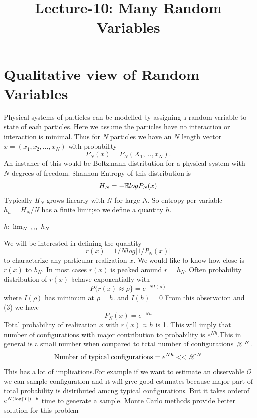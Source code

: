 \documentclass[letterpaper,english,10pt]{article}
\title{Lecture-10: Many Random Variables}
\begin{document}
\maketitle
\section{Qualitative view of Random Variables}
Physical systems of particles can be modelled by assigning a random variable to state of each particles. Here we assume the particles have no interaction or interaction is minimal. Thus for $N$ particles we have an $N$ length vector $x = (x_1,x_2,\dots ,x_N)$ with probability 
\begin{equation}
  P_N(x) = P_N(X_1,\dots ,x_N) .
\end{equation}
An instance of this would be Boltzmann distribution for a physical system with $N$ degrees of freedom. Shannon Entropy of this distribution is 
  \begin{equation}
      H_N = -\mathbb{E} {log P_N(x) }
  \end{equation}
  Typically $H_N$ grows linearly with $N$ for large $N$. So entropy per variable $h_n=H_N/N$ has a finite limit;so we define a quantity $h$.
  
 \begin{defn}
 	$h: \lim_{N\to\infty} h_N$
 \end{defn}
  We will be interested in defining the quantity 
  \begin{equation}
      r(x) = 1/N log \big[ 1/P_N(x)\big]
  \end{equation}
  to characterize any particular realization $\underbar{x}$. We would like to know how close is $r(x)$ to $h_N$. In most cases $r(x)$ is peaked around $r=h_N$. Often probability distribution of $r(x)$ behave exponentially with 
  \begin{equation}
   P\lbrace r(x) \approx \rho \rbrace=e^{-NI(\rho)}
   \end{equation}
   where
   $I(\rho)$ has minimum at $\rho = h$.
   and $I(h)=0$
   From this observation and (3) we have 
   \begin{equation}
       P_N(x) = e^{-Nh}
   \end{equation}
   Total probability of realization $x$ with $r(x) \approx h$ is 1. This will imply that number of configurations with major contribution to probability is $e^{Nh}. $This in general is a  small number when compared to total number of configurations $\mathscr{X}^N$. 
   \begin{equation}
   	\text{Number of typical configurations}=e^{Nh}<<\mathscr{X}^N
   \end{equation}
   This has a lot of implications.For example if we want to estimate an observable $\mathcal{O}$ we can sample configuration and it will give good estimates because major part of total probability is distributed among typical configurations. But it takes orderof $e^{N(\log\left\lvert\mathcal{X}\right\rvert)-h}$ time to generate a sample. Monte Carlo methods provide better solution for this problem
\end{document}
